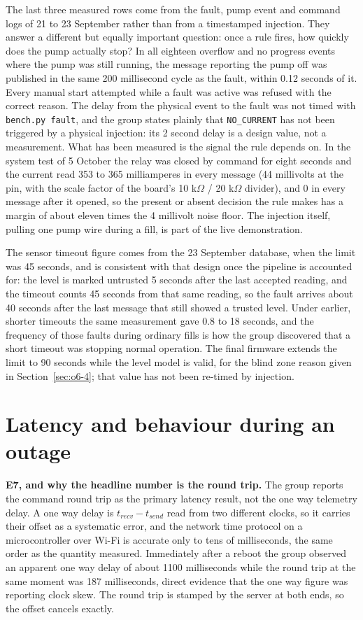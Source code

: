 The last three measured rows come from the fault, pump event and command logs of 21 to 23 September rather than from a timestamped injection. They answer a different but equally important question: once a rule fires, how quickly does the pump actually stop? In all eighteen overflow and no progress events where the pump was still running, the message reporting the pump off was published in the same 200 millisecond cycle as the fault, within 0.12 seconds of it. Every manual start attempted while a fault was active was refused with the correct reason. The delay from the physical event to the fault was not timed with \texttt{bench.py fault}, and the group states plainly that \texttt{NO\_CURRENT} has not been triggered by a physical injection: its 2 second delay is a design value, not a measurement. What has been measured is the signal the rule depends on. In the system test of 5 October the relay was closed by command for eight seconds and the current read 353 to 365 milliamperes in every message (44 millivolts at the pin, with the scale factor of the board's 10 k$\Omega$ / 20 k$\Omega$ divider), and 0 in every message after it opened, so the present or absent decision the rule makes has a margin of about eleven times the 4 millivolt noise floor. The injection itself, pulling one pump wire during a fill, is part of the live demonstration.

The sensor timeout figure comes from the 23 September database, when the limit was 45 seconds, and is consistent with that design once the pipeline is accounted for: the level is marked untrusted 5 seconds after the last accepted reading, and the timeout counts 45 seconds from that same reading, so the fault arrives about 40 seconds after the last message that still showed a trusted level. Under earlier, shorter timeouts the same measurement gave 0.8 to 18 seconds, and the frequency of those faults during ordinary fills is how the group discovered that a short timeout was stopping normal operation. The final firmware extends the limit to 90 seconds while the level model is valid, for the blind zone reason given in Section~\ref{sec:o6-4}; that value has not been re-timed by injection.

\section{Latency and behaviour during an outage}
\label{sec:o8-5}

\textbf{E7, and why the headline number is the round trip.} The group reports the command round trip as the primary latency result, not the one way telemetry delay. A one way delay is $t_{recv} - t_{send}$ read from two different clocks, so it carries their offset as a systematic error, and the network time protocol on a microcontroller over Wi-Fi is accurate only to tens of milliseconds, the same order as the quantity measured. Immediately after a reboot the group observed an apparent one way delay of about 1100 milliseconds while the round trip at the same moment was 187 milliseconds, direct evidence that the one way figure was reporting clock skew. The round trip is stamped by the server at both ends, so the offset cancels exactly.

